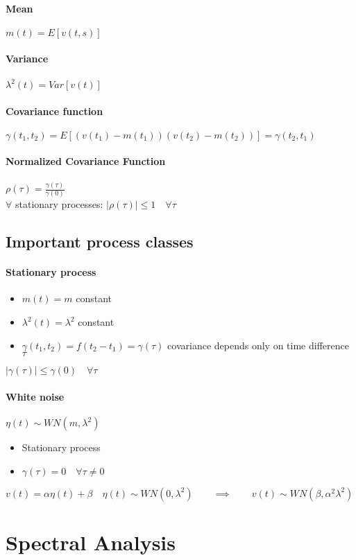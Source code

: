 \documentclass{report}
\begin{document}
\paragraph{Mean} $m(t)=E[v(t,s)]$
\paragraph{Variance}
$\lambda^2 (t)=Var[v(t)]$ 
\paragraph{Covariance function}
$\gamma(t_1,t_2)=E[(v(t_1)-m(t_1))(v(t_2)-m(t_2))]=\gamma(t_2,t_1)$
\paragraph{Normalized Covariance Function}
$\rho(\tau)=\frac{\gamma(\tau)}{\gamma(0)}$\\
$\forall$ stationary processes: $|\rho(\tau)|\leq1	\quad\forall\tau$

\subsection{Important process classes}

\paragraph{Stationary process}
\begin{itemize}
	\item $m(t)=m$ constant
	\item $\lambda^2 (t)=\lambda^2$ constant
	\item $\gamma(t_1,t_2)=f(t_2-t_1)=\gamma(\tau)$ covariance depends only on time difference $\tau$
\end{itemize}
$|\gamma(\tau)|\leq\gamma(0)		\quad\forall\tau$
\paragraph{White noise} $\eta(t)\sim WN(m,\lambda^2)$
\begin{itemize}
	\item Stationary process
	\item $\gamma(\tau)=0	\quad\forall\tau\neq0$
\end{itemize}
$v(t)=\alpha \eta (t)+\beta	\quad 
\eta (t)\sim WN(0,\lambda^2)	
\qquad\implies\qquad 
v(t)\sim WN(\beta,\alpha^2 \lambda^2)$

\section{Spectral Analysis}
\end{document}

